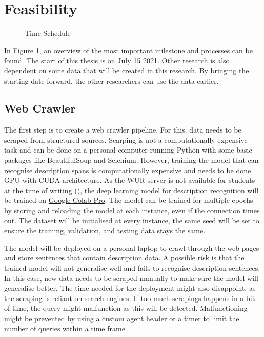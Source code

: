 \documentclass[a4paper, 12pt, oneside]{book} %
\begin{document}
\section{Feasibility}

\begin{figure} [ht]
    \centering
    \vspace{1cm}
    \hspace{-1.3cm}
    \makebox[\textwidth][c]{}
    \caption{Time Schedule}
    \label{fig:time_schedule}
\end{figure}

In Figure \ref{fig:time_schedule}, an overview of the most important milestone and processes can be found.
The start of this thesis is on July 15 2021.
Other research is also dependent on some data that will be created in this research.
By bringing the starting date forward, the other researchers can use the data earlier.

\subsection{Web Crawler}
The first step is to create a web crawler pipeline. 
For this, data needs to be scraped from structured sources.
Scarping is not a computationally expensive task and can be done on a personal computer running Python with some basic packages like BeautifulSoup and Selenium.
However, training the model that can recognise description spans is computationally expensive and needs to be done GPU with CUDA architecture.
As the WUR server is not available for students at the time of writing (\thedate), the deep learning model for description recognition will be trained on \href{https://colab.research.google.com/}{Google Colab Pro}. 
The model can be trained for multiple epochs by storing and reloading the model at each instance, even if the connection times out.
The dataset will be initialised at every instance, the same seed will be set to ensure the training, validation, and testing data stays the same.

The model will be deployed on a personal laptop to crawl through the web pages and store sentences that contain description data.
A possible risk is that the trained model will not generalise well and fails to recognise description sentences.
In this case, new data needs to be scraped manually to make sure the model will generalise better.
The time needed for the deployment might also disappoint, as the scraping is reliant on search engines.
If too much scrapings happens in a bit of time, the query might malfunction as this will be detected.
Malfunctioning might be prevented by using a custom agent header or a timer to limit the number of queries within a time frame.
\end{document}
